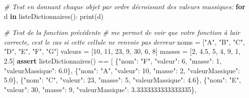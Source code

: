 \documentclass[
  paper=a4,
  ,captions=tableheading
]{scrartcl}
\newenvironment{Shaded}{}{}
\newcommand{\BuiltInTok}[1]{\textcolor[rgb]{0.00,0.50,0.00}{#1}}
\newcommand{\CommentTok}[1]{\textcolor[rgb]{0.38,0.63,0.69}{\textit{#1}}}
\newcommand{\ControlFlowTok}[1]{\textcolor[rgb]{0.00,0.44,0.13}{\textbf{#1}}}
\newcommand{\DecValTok}[1]{\textcolor[rgb]{0.25,0.63,0.44}{#1}}
\newcommand{\FloatTok}[1]{\textcolor[rgb]{0.25,0.63,0.44}{#1}}
\newcommand{\KeywordTok}[1]{\textcolor[rgb]{0.00,0.44,0.13}{\textbf{#1}}}
\newcommand{\NormalTok}[1]{#1}
\newcommand{\OperatorTok}[1]{\textcolor[rgb]{0.40,0.40,0.40}{#1}}
\newcommand{\StringTok}[1]{\textcolor[rgb]{0.25,0.44,0.63}{#1}}
\begin{document}
\begin{Shaded}
\begin{Highlighting}[]
\CommentTok{\# Test en donnant chaque objet par ordre décroissant des valeurs massiques:}
\ControlFlowTok{for}\NormalTok{ d }\KeywordTok{in}\NormalTok{ listeDictionnaires():}
    \BuiltInTok{print}\NormalTok{(d)}
\end{Highlighting}
\end{Shaded}

\begin{Shaded}
\begin{Highlighting}[]
\CommentTok{\# Test de la fonction précédente}
\CommentTok{\# me permet de voir que votre fonction à l\textquotesingle{}air correcte, c\textquotesingle{}est le cas si cette cellule ne renvoie pas d\textquotesingle{}erreur}
\NormalTok{noms }\OperatorTok{=}\NormalTok{ [}\StringTok{"A"}\NormalTok{, }\StringTok{"B"}\NormalTok{, }\StringTok{"C"}\NormalTok{, }\StringTok{"D"}\NormalTok{, }\StringTok{"E"}\NormalTok{, }\StringTok{"F"}\NormalTok{, }\StringTok{"G"}\NormalTok{]}
\NormalTok{valeurs }\OperatorTok{=}\NormalTok{ [}\DecValTok{10}\NormalTok{, }\DecValTok{11}\NormalTok{, }\DecValTok{23}\NormalTok{, }\DecValTok{9}\NormalTok{, }\DecValTok{30}\NormalTok{, }\DecValTok{6}\NormalTok{, }\DecValTok{8}\NormalTok{]}
\NormalTok{masses }\OperatorTok{=}\NormalTok{ [}\DecValTok{2}\NormalTok{, }\FloatTok{4.5}\NormalTok{, }\DecValTok{5}\NormalTok{, }\DecValTok{4}\NormalTok{, }\DecValTok{9}\NormalTok{, }\DecValTok{1}\NormalTok{, }\FloatTok{2.5}\NormalTok{]}
\ControlFlowTok{assert}\NormalTok{ listeDictionnaires() }\OperatorTok{==}\NormalTok{ [}
\NormalTok{    \{}\StringTok{"nom"}\NormalTok{: }\StringTok{"F"}\NormalTok{, }\StringTok{"valeur"}\NormalTok{: }\DecValTok{6}\NormalTok{, }\StringTok{"masse"}\NormalTok{: }\DecValTok{1}\NormalTok{, }\StringTok{"valeurMassique"}\NormalTok{: }\FloatTok{6.0}\NormalTok{\},}
\NormalTok{    \{}\StringTok{"nom"}\NormalTok{: }\StringTok{"A"}\NormalTok{, }\StringTok{"valeur"}\NormalTok{: }\DecValTok{10}\NormalTok{, }\StringTok{"masse"}\NormalTok{: }\DecValTok{2}\NormalTok{, }\StringTok{"valeurMassique"}\NormalTok{: }\FloatTok{5.0}\NormalTok{\},}
\NormalTok{    \{}\StringTok{"nom"}\NormalTok{: }\StringTok{"C"}\NormalTok{, }\StringTok{"valeur"}\NormalTok{: }\DecValTok{23}\NormalTok{, }\StringTok{"masse"}\NormalTok{: }\DecValTok{5}\NormalTok{, }\StringTok{"valeurMassique"}\NormalTok{: }\FloatTok{4.6}\NormalTok{\},}
\NormalTok{    \{}\StringTok{"nom"}\NormalTok{: }\StringTok{"E"}\NormalTok{, }\StringTok{"valeur"}\NormalTok{: }\DecValTok{30}\NormalTok{, }\StringTok{"masse"}\NormalTok{: }\DecValTok{9}\NormalTok{, }\StringTok{"valeurMassique"}\NormalTok{: }\FloatTok{3.3333333333333335}\NormalTok{\},}

\end{Highlighting}
\end{Shaded}
\end{document}
